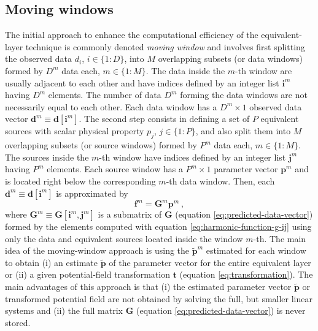 \subsection{Moving windows}

The initial approach to enhance the computational efficiency of the equivalent-layer technique 
is commonly denoted \textit{moving window} and involves
first splitting the observed data $d_{i}$, $i \in \{1 : D\}$, into $M$ overlapping subsets (or data windows) 
formed by $D^{m}$ data each, $m \in \{ 1 : M \}$.
The data inside the $m$-th window are usually adjacent to each other and have indices defined by an 
integer list $\mathbf{i}^{m}$ having $D^{m}$ elements.
The number of data $D^{m}$ forming the data windows are not necessarily equal to each other.
Each data window has a $D^{m} \times 1$ observed data vector $\mathbf{d}^{m} \equiv \mathbf{d}[\mathbf{i}^{m}]$.
The second step consists in defining a set of $P$ equivalent sources with scalar physical property $p_{j}$, $j \in \{1:P\}$,
and also split them into $M$ overlapping subsets (or source windows) formed by $P^{m}$ data each, $m \in \{ 1 : M \}$.
The sources inside the $m$-th window have indices defined by an integer list $\mathbf{j}^{m}$ having $P^{m}$ elements.
Each source window has a $P^{m} \times 1$ parameter vector $\mathbf{p}^{m}$ and
is located right below the corresponding $m$-th data window. 
Then, each $\mathbf{d}^{m} \equiv \mathbf{d}[\mathbf{i}^{m}]$ is approximated by 
\begin{equation}
	\mathbf{f}^{m} = \mathbf{G}^{m} \mathbf{p}^{m} \: ,
	\label{eq:predicted-data-window-m}
\end{equation}
where $\mathbf{G}^{m} \equiv \mathbf{G}[\mathbf{i}^{m}, \mathbf{j}^{m}]$ is a submatrix of 
$\mathbf{G}$ (equation \ref{eq:predicted-data-vector}) formed by the elements computed with equation 
\ref{eq:harmonic-function-g-ij} using only the data and equivalent sources located inside the window $m$-th.
The main idea of the moving-window approach is using the $\tilde{\mathbf{p}}^{m}$ estimated for 
each window to obtain (i) an estimate $\tilde{\mathbf{p}}$ of the parameter vector for the entire equivalent layer
or (ii) a given potential-field transformation $\mathbf{t}$ (equation \ref{eq:transformation}).
The main advantages of this approach is that (i) the estimated parameter vector $\tilde{\mathbf{p}}$ or transformed potential field
are not obtained by solving the full, but smaller linear systems and (ii) the full matrix $\mathbf{G}$ (equation \ref{eq:predicted-data-vector})
is never stored.

